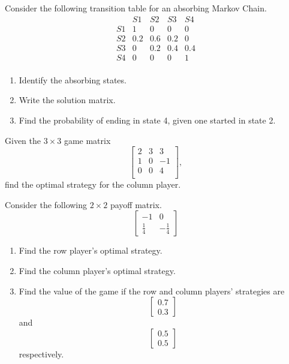 \begin{puzzle}
    Consider the following transition table for an absorbing Markov Chain.
    \[
        \begin{array}{c|cccc}
               & S1  & S2  & S3  & S4  \\
            \hline
            S1 & 1   & 0   & 0   & 0   \\
            S2 & 0.2 & 0.6 & 0.2 & 0   \\
            S3 & 0   & 0.2 & 0.4 & 0.4 \\
            S4 & 0   & 0   & 0   & 1   \\
        \end{array}
    \]
    \begin{enumerate}
        \item Identify the absorbing states.
        \item Write the solution matrix.
        \item Find the probability of ending in state 4, given one started in state 2.
    \end{enumerate}
\end{puzzle}


\begin{puzzle}
    Given the $3 \times 3$ game matrix
    \[
        \begin{bmatrix}
            2 & 3 & 3  \\
            1 & 0 & -1 \\
            0 & 0 & 4  \\
        \end{bmatrix},
    \]
    find the optimal strategy for the column player.
\end{puzzle}

\begin{puzzle}
    Consider the following $2 \times 2$ payoff matrix.
    \[
        \begin{bmatrix}
            -1          & 0            \\
            \frac{1}{4} & -\frac{1}{4}
        \end{bmatrix}
    \]
    \begin{enumerate}
        \item Find the row player's optimal strategy.
        \item Find the column player's optimal strategy.
        \item Find the value of the game if the row and column players' strategies are
              \[
                  \begin{bmatrix}
                      0.7 \\
                      0.3
                  \end{bmatrix}
              \]
              and
              \[
                  \begin{bmatrix}
                      0.5 \\
                      0.5
                  \end{bmatrix}
              \]
              respectively.
    \end{enumerate}
\end{puzzle}
